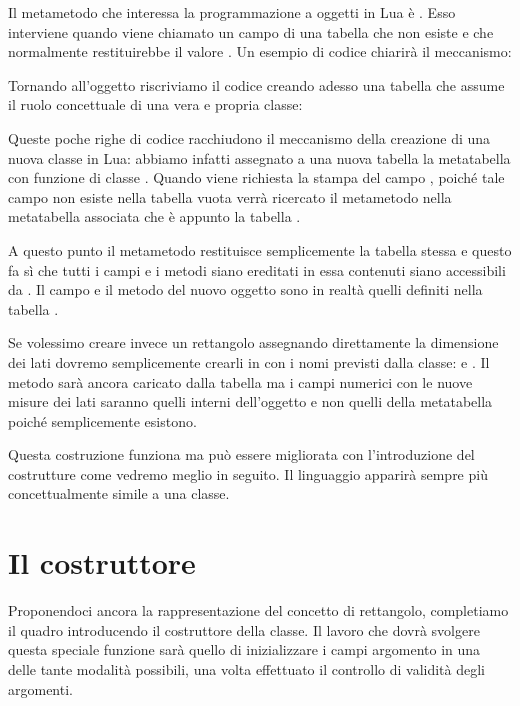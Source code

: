 Il metametodo che interessa la programmazione a oggetti in Lua è
. Esso interviene quando viene chiamato un campo di una tabella
che non esiste e che normalmente restituirebbe il valore . Un esempio
di codice chiarirà il meccanismo:

Tornando all'oggetto  riscriviamo il codice creando adesso una
tabella che assume il ruolo concettuale di una vera e propria classe:

Queste poche righe di codice racchiudono il meccanismo della creazione di una
nuova classe in Lua: abbiamo infatti assegnato a una nuova tabella  la
metatabella con funzione di classe . Quando viene richiesta la
stampa del campo , poiché tale campo non esiste nella tabella
vuota  verrà ricercato il metametodo  nella metatabella
associata che è appunto la tabella .

A questo punto il metametodo restituisce semplicemente la tabella
 stessa e questo fa sì che tutti i campi e i metodi siano
ereditati in essa contenuti siano accessibili da . Il campo
 e il metodo  del nuovo oggetto  sono in realtà
quelli definiti nella tabella .

Se volessimo creare invece un rettangolo assegnando direttamente la dimensione
dei lati dovremo semplicemente crearli in  con i nomi previsti dalla
classe:  e . Il metodo  sarà ancora
caricato dalla tabella  ma i campi numerici con le nuove misure
dei lati saranno quelli interni dell'oggetto  e non quelli della
metatabella poiché semplicemente esistono.

Questa costruzione funziona ma può essere migliorata con l'introduzione del
costrutture come vedremo meglio in seguito. Il linguaggio apparirà sempre più
concettualmente simile a una classe.


\section{Il costruttore}
\label{secFondCostruttore}

Proponendoci ancora la rappresentazione del concetto di rettangolo, completiamo
il quadro introducendo il costruttore della classe. Il lavoro che dovrà
svolgere questa speciale funzione sarà quello di inizializzare i campi
argomento in una delle tante modalità possibili, una volta effettuato il
controllo di validità degli argomenti.

